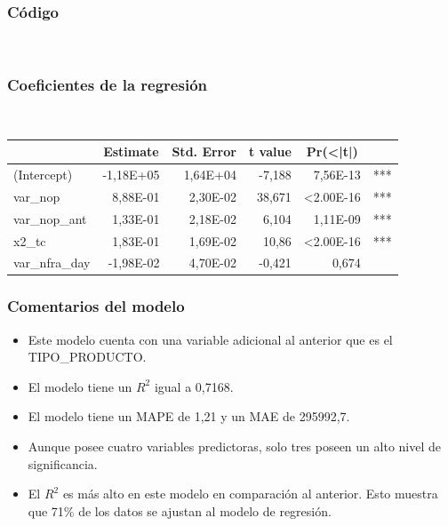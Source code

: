 \documentclass[
	11pt, %
	spanish, %
]{fphw}
\begin{document}
\subsubsection*{Código}\hfill\\

	

\subsubsection*{Coeficientes de la regresión} \hfill \\
\begin{table}[h!]
\centering
\label{coef2}
\begin{tabular}{lrrrrl}
\hline
 & \multicolumn{1}{c}{\textbf{Estimate}} & \multicolumn{1}{c}{\textbf{Std. Error}} & \multicolumn{1}{c}{\textbf{t value}} & \multicolumn{1}{c}{\textbf{Pr(\textless{}|t|)}} &  \\ \hline
(Intercept) & -1,18E+05 & 1,64E+04 & -7,188 & 7,56E-13 & *** \\
var\_nop & 8,88E-01 & 2,30E-02 & 38,671 & \textless 2.00E-16 & *** \\
var\_nop\_ant & 1,33E-01 & 2,18E-02 & 6,104 & 1,11E-09 & *** \\
x2\_tc & 1,83E-01 & 1,69E-02 & 10,86 & \textless 2.00E-16 & *** \\
var\_nfra\_day & -1,98E-02 & 4,70E-02 & -0,421 & 0,674 & 
\end{tabular}
\end{table}
	
\subsubsection*{Comentarios del modelo}

\begin{itemize}
\item Este modelo cuenta con una variable adicional al anterior que es el TIPO\_PRODUCTO.
\item El modelo tiene un $R^{2}$ igual a 0,7168.
\item El modelo tiene un MAPE de 1,21 y un MAE de 295992,7.
\item Aunque posee cuatro variables predictoras, solo tres poseen un alto nivel de significancia.
\item El $R^{2}$ es más alto en este modelo en comparación al anterior. Esto muestra que 71\% de los datos se ajustan al modelo de regresión.
\end{itemize}
\end{document}
